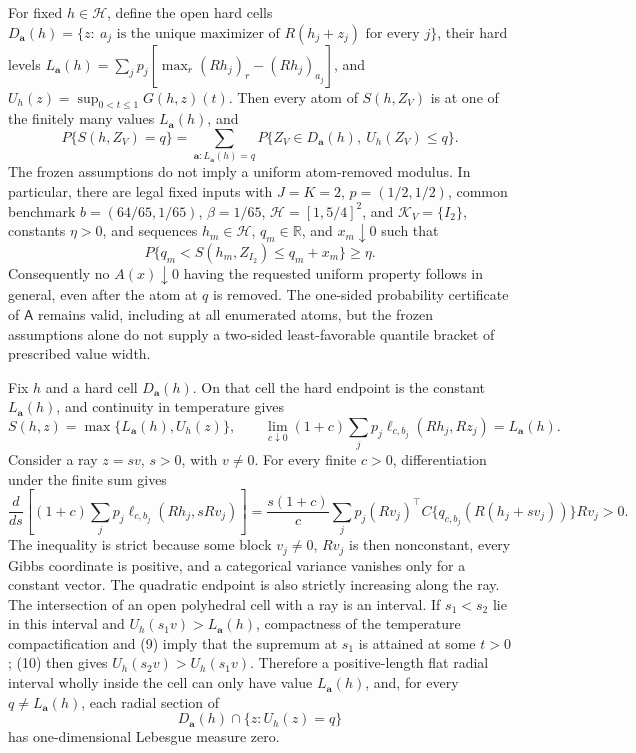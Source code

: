 For fixed \(h\in\mathcal H\), define the open hard cells \(D_{\mathbf a}(h)=\{z:\ a_j\text{ is the unique maximizer of }R(h_j+z_j)\text{ for every }j\}\), their hard levels \(L_{\mathbf a}(h)=\sum_jp_j[\max_r(Rh_j)_r-(Rh_j)_{a_j}]\), and \(U_h(z)=\sup_{0<t\le1}G(h,z)(t)\).  Then every atom of \(S(h,Z_V)\) is at one of the finitely many values \(L_{\mathbf a}(h)\), and
\[
 P\{S(h,Z_V)=q\}=\sum_{\mathbf a:L_{\mathbf a}(h)=q}P\{Z_V\in D_{\mathbf a}(h),\ U_h(Z_V)\le q\}.
\]
The frozen assumptions do not imply a uniform atom-removed modulus.  In particular, there are legal fixed inputs with \(J=K=2\), \(p=(1/2,1/2)\), common benchmark \(b=(64/65,1/65)\), \(\beta=1/65\), \(\mathcal H=[1,5/4]^2\), and \(\mathcal K_V=\{I_2\}\), constants \(\eta>0\), and sequences \(h_m\in\mathcal H\), \(q_m\in\mathbb R\), and \(x_m\downarrow0\) such that
\[
 P\{q_m<S(h_m,Z_{I_2})\le q_m+x_m\}\ge\eta.
\]
Consequently no \(A(x)\downarrow0\) having the requested uniform property follows in general, even after the atom at \(q\) is removed.  The one-sided probability certificate of \(\mathsf A\) remains valid, including at all enumerated atoms, but the frozen assumptions alone do not supply a two-sided least-favorable quantile bracket of prescribed value width.

Fix \(h\) and a hard cell \(D_{\mathbf a}(h)\).  On that cell the hard endpoint is the constant \(L_{\mathbf a}(h)\), and continuity in temperature gives
\[
 S(h,z)=\max\{L_{\mathbf a}(h),U_h(z)\},\qquad
 \lim_{c\downarrow0}(1+c)\sum_jp_j\ell_{c,b_j}(Rh_j,Rz_j)=L_{\mathbf a}(h).       \tag{9}
\]
Consider a ray \(z=sv\), \(s>0\), with \(v\ne0\).  For every finite \(c>0\), differentiation under the finite sum gives
\[
 \frac{d}{ds}\left[(1+c)\sum_jp_j\ell_{c,b_j}(Rh_j,sRv_j)\right]
 =\frac{s(1+c)}c\sum_jp_j(Rv_j)^\top C\{q_{c,b_j}(R(h_j+sv_j))\}Rv_j>0.          \tag{10}
\]
The inequality is strict because some block \(v_j\ne0\), \(Rv_j\) is then nonconstant, every Gibbs coordinate is positive, and a categorical variance vanishes only for a constant vector.  The quadratic endpoint is also strictly increasing along the ray.  The intersection of an open polyhedral cell with a ray is an interval.  If \(s_1<s_2\) lie in this interval and \(U_h(s_1v)>L_{\mathbf a}(h)\), compactness of the temperature compactification and (9) imply that the supremum at \(s_1\) is attained at some \(t>0\); (10) then gives \(U_h(s_2v)>U_h(s_1v)\).  Therefore a positive-length flat radial interval wholly inside the cell can only have value \(L_{\mathbf a}(h)\), and, for every \(q\ne L_{\mathbf a}(h)\), each radial section of
\[
 D_{\mathbf a}(h)\cap\{z:U_h(z)=q\}
\]
has one-dimensional Lebesgue measure zero.

